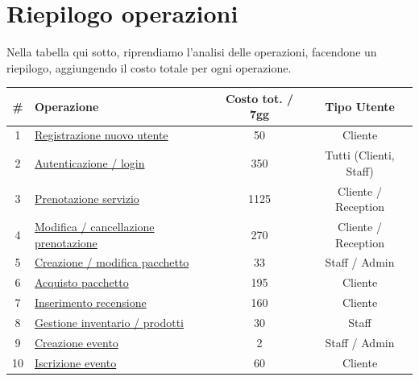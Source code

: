 \documentclass[a4paper,12pt]{report}
\begin{document}
\newpage
\section{Riepilogo operazioni}
Nella tabella qui sotto, riprendiamo l'analisi delle operazioni, facendone un riepilogo, aggiungendo
il costo totale per ogni operazione.

\begin{table}[H]
	\centering
	\small
	\renewcommand{\arraystretch}{1.12}
	\begin{tabularx}{\textwidth}{|c|>{\raggedright\arraybackslash}X|c|c|}
		\hline
		\rowcolor{gray!20}
		\textbf{\#} & \textbf{Operazione}                                                    & \textbf{Costo tot. / 7gg} & \textbf{Tipo Utente}   \\
		\hline
		1           & \hyperref[op1]{Registrazione nuovo utente}                             & 50                        & Cliente                \\
		\hline
		2           & \hyperref[op2]{Autenticazione / login}                                 & 350                       & Tutti (Clienti, Staff) \\
		\hline
		3           & \hyperref[op3]{Prenotazione servizio}                                  & 1125                      & Cliente / Reception    \\
		\hline
		4           & \hyperref[op4]{Modifica / cancellazione prenotazione}                  & 270                       & Cliente / Reception    \\
		\hline
		5           & \hyperref[op5]{Creazione / modifica pacchetto}                         & 33                        & Staff / Admin          \\
		\hline
		6           & \hyperref[op6]{Acquisto pacchetto}                                     & 195                       & Cliente                \\
		\hline
		7           & \hyperref[op7]{Inserimento recensione}                                 & 160                       & Cliente                \\
		\hline
		8           & \hyperref[op8]{Gestione inventario / prodotti}                         & 30                        & Staff                  \\
		\hline
		9           & \hyperref[op9]{Creazione evento}                                       & 2                         & Staff / Admin          \\
		\hline
		10          & \hyperref[op10]{Iscrizione evento}                                     & 60                        & Cliente                \\

\end{tabularx}
\end{table}
\end{document}
